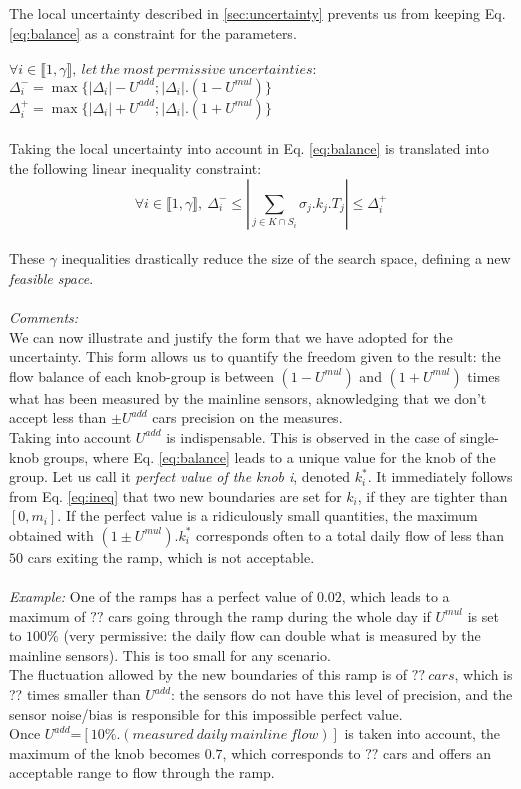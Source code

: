 The local uncertainty described in \ref{sec:uncertainty} prevents us from keeping Eq. \ref{eq:balance} as a constraint for the parameters.\\
\\
$\forall i \in {\llbracket 1,\gamma \rrbracket},\ let\ the\ most\ permissive\ uncertainties:$\\
$\Delta_{i}^{-}=\max{\{|\Delta_{i}|-U^{add};|\Delta_{i}|.(1-U^{mul})\}}$\\
$\Delta_{i}^{+}=\max{\{|\Delta_{i}|+U^{add};|\Delta_{i}|.(1+U^{mul})\}}$\\
\\
Taking the local uncertainty into account in Eq. \ref{eq:balance} is translated into the following linear inequality constraint:
\begin{equation}
\label{eq:ineq}
	\forall i\in \llbracket 1,\gamma \rrbracket,\ \Delta_{i}^{-}\leq |\sum\limits_{j\in K\cap S_{i}}\sigma_{j}.k_{j}.T_{j}| \leq \Delta_{i}^{+}
\end{equation}
\\
These $\gamma$ inequalities drastically reduce the size of the search space, defining a new \emph{feasible space}.\\
\\
\emph{Comments:}\\
We can now illustrate and justify the form that we have adopted for the uncertainty. This form allows us to quantify the freedom given to the result: the flow balance of each knob-group is between $(1-U^{mul})$ and $(1+U^{mul})$ times what has been measured by the mainline sensors, aknowledging that we don't accept less than $\pm U^{add}$ cars precision on the measures.\\
Taking into account $U^{add}$ is indispensable. This is observed in the case of single-knob groups, where Eq. \ref{eq:balance} leads to a unique value for the knob of the group. Let us call it \emph{perfect value of the knob i}, denoted $k_{i}^{*}$. It immediately follows from Eq. \ref{eq:ineq} that two new boundaries are set for $k_{i}$, if they are tighter than $[0,m_{i}]$.  If the perfect value is a ridiculously small quantities, the maximum obtained with $(1\pm U^{mul}).k_{i}^{*}$ corresponds often to a total daily flow of less than $50$ cars exiting the ramp, which is not acceptable.\\ 
\\
\emph{Example:} One of the ramps has a perfect value of $0.02$, which leads to a maximum of $??$ cars going through the ramp during the whole day if $U^{mul}$ is set to $100\%$ (very permissive: the daily flow can double what is measured by the mainline sensors). This is too small for any scenario.\\ The fluctuation allowed by the new boundaries of this ramp is of $??\ cars$, which is ?? times smaller than $U^{add}$: the sensors do not have this level of precision, and the sensor noise/bias is responsible for this impossible perfect value. \\
Once $U^{add}$=$[10\%.(measured\ daily\ mainline\ flow)]$ is taken into account, the maximum of the knob becomes $0.7$, which corresponds to $??$ cars and offers an acceptable range to flow through the ramp.\\